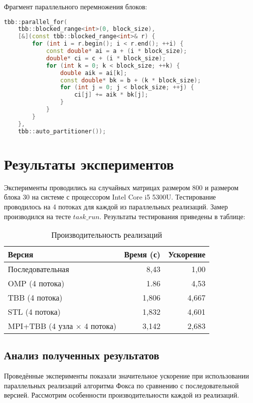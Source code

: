 \documentclass[12pt,a4paper]{extarticle}
\begin{document}
\vspace{1em}
\noindent Фрагмент параллельного перемножения блоков:

\begin{lstlisting}[language=C++,basicstyle=\ttfamily\small,caption={TBB-умножение блоков}]
	tbb::parallel_for(
	tbb::blocked_range<int>(0, block_size),
	[&](const tbb::blocked_range<int>& r) {
		for (int i = r.begin(); i < r.end(); ++i) {
			const double* ai = a + (i * block_size);
			double* ci = c + (i * block_size);
			for (int k = 0; k < block_size; ++k) {
				double aik = ai[k];
				const double* bk = b + (k * block_size);
				for (int j = 0; j < block_size; ++j) {
					ci[j] += aik * bk[j];
				}
			}
		}
	},
	tbb::auto_partitioner());
\end{lstlisting}

\newpage
\section{Результаты экспериментов}
Эксперименты проводились на случайных матрицах размером 800 и размером блока 30 на системе с процессором Intel Core i5 5300U. Тестирование проводилось на 4 потоках для каждой из параллельных реализаций. Замер производился на тесте $task\_run$. Результаты тестирования приведены в таблице:

\begin{table}[h]
\centering
\begin{tabular}{lrr}
\toprule
\textbf{Версия} & \textbf{Время (с)} & \textbf{Ускорение} \\
\midrule
Последовательная & 8,43 & 1,00 \\
OMP (4 потока) & 1.86 & 4,53   \\
TBB (4 потока) & 1,806 & 4,667 \\
STL (4 потока) & 1,832 & 4,601 \\
MPI+TBB (4 узла $\times$ 4 потока) & 3,142 & 2,683 \\

\bottomrule

\end{tabular}
\caption{Производительность реализаций}
\label{tab:performance}
\end{table}

\subsection{Анализ полученных результатов}

Проведённые эксперименты показали значительное ускорение при использовании параллельных реализаций алгоритма Фокса по сравнению с последовательной версией.  
Рассмотрим особенности производительности каждой из реализаций.
\end{document}

